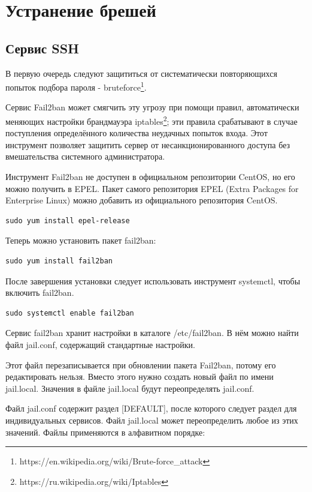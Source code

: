 \section{Устранение брешей}

\subsection{Сервис SSH}

В первую очередь следуют защититься от систематически повторяющихся попыток подбора пароля - bruteforce\footnote{https://en.wikipedia.org/wiki/Brute-force\_attack}.

Сервис Fail2ban может смягчить эту угрозу при помощи правил, автоматически меняющих настройки брандмауэра iptables\footnote{https://ru.wikipedia.org/wiki/Iptables}; эти правила срабатывают в случае поступления определённого количества неудачных попыток входа. Этот инструмент позволяет защитить сервер от несанкционированного доступа без вмешательства системного администратора.

Инструмент Fail2ban не доступен в официальном репозитории CentOS, но его можно получить в EPEL. Пакет самого репозитория EPEL (Extra Packages for Enterprise Linux) можно добавить из официального репозитория CentOS.

\begin{lstlisting}
sudo yum install epel-release
\end{lstlisting}

Теперь можно установить пакет fail2ban:

\begin{lstlisting}
sudo yum install fail2ban
\end{lstlisting}

После завершения установки следует использовать инструмент systemctl, чтобы включить fail2ban.

\begin{lstlisting}
sudo systemctl enable fail2ban
\end{lstlisting}

Сервис fail2ban хранит настройки в каталоге /etc/fail2ban. В нём можно найти файл jail.conf, содержащий стандартные настройки.

Этот файл перезаписывается при обновлении пакета Fail2ban, потому его редактировать нельзя. Вместо этого нужно создать новый файл по имени jail.local. Значения в файле jail.local будут переопределять jail.conf.

Файл jail.conf содержит раздел [DEFAULT], после которого следует раздел для индивидуальных сервисов. Файл jail.local может переопределить любое из этих значений. Файлы применяются в алфавитном порядке:

